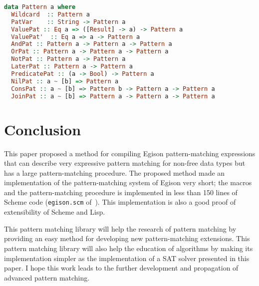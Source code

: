 \documentclass[acmlarge]{acmart}
\begin{document}
\begin{lstlisting}[language=haskell]
data Pattern a where
  Wildcard  :: Pattern a
  PatVar    :: String -> Pattern a
  ValuePat :: Eq a => ([Result] -> a) -> Pattern a
  ValuePat'  :: Eq a => a -> Pattern a
  AndPat :: Pattern a -> Pattern a -> Pattern a
  OrPat :: Pattern a -> Pattern a -> Pattern a
  NotPat :: Pattern a -> Pattern a
  LaterPat :: Pattern a -> Pattern a
  PredicatePat :: (a -> Bool) -> Pattern a
  NilPat :: a ~ [b] => Pattern a
  ConsPat :: a ~ [b] => Pattern b -> Pattern a -> Pattern a
  JoinPat :: a ~ [b] => Pattern a -> Pattern a -> Pattern a
\end{lstlisting}

\section{Conclusion}\label{conclusion}

This paper proposed a method for compiling Egison pattern-matching expressions that can describe very expressive pattern matching for non-free data types but has a large pattern-matching procedure.
The proposed method made an implementation of the pattern-matching system of Egison very short; the macros and the pattern-matching procedure is implemented in less than 150 lines of Scheme code (\texttt{egison.scm} of~\cite{egisonScheme}).
This implementation is also a good proof of extensibility of Scheme and Lisp.

This pattern matching library will help the research of pattern matching by providing an easy method for developing new pattern-matching extensions.
This pattern matching library will also help the education of algorithms by making its implementation simpler as the implementation of a SAT solver presented in this paper.
I hope this work leads to the further development and propagation of advanced pattern matching.




\end{document}
